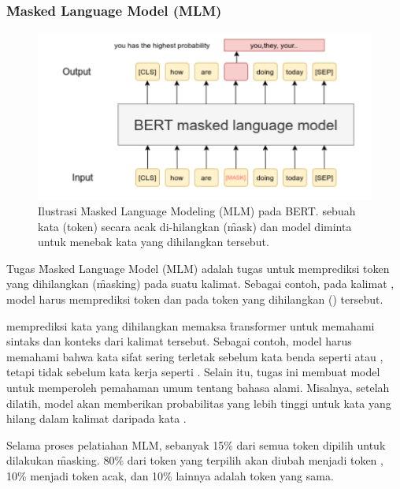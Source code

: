 	\subsubsection{\f{Masked Language Model} (MLM)}
	\label{sec:masked-language-model}

	\begin{figure}[!ht]
		\centering
		\includegraphics[width=1\textwidth]{assets/pics/MLM.png}
		\caption{Ilustrasi \f{Masked Language Modeling} (MLM) pada BERT. sebuah kata (token) secara acak di-hilangkan (\f{mask}) dan model diminta untuk menebak kata yang dihilangkan tersebut.}
		\label{fig:masked-language-model}
	\end{figure}

	Tugas \f{Masked Language Model} (MLM) adalah tugas untuk memprediksi token yang dihilangkan (\f{masking}) pada suatu kalimat. Sebagai contoh, pada kalimat , model harus memprediksi token  dan  pada token yang dihilangkan (\code{[MASK]}) tersebut.


	memprediksi kata yang dihilangkan memaksa \f{transformer} untuk memahami sintaks dan konteks dari kalimat tersebut. Sebagai contoh, model harus memahami bahwa kata sifat  sering terletak sebelum kata benda seperti  atau , tetapi tidak sebelum kata kerja seperti . Selain itu, tugas ini membuat model untuk memperoleh pemahaman umum tentang bahasa alami. Misalnya, setelah dilatih, model akan memberikan probabilitas yang lebih tinggi untuk kata  yang hilang dalam kalimat  daripada kata .

	Selama proses pelatiahan MLM, sebanyak 15\% dari semua token dipilih untuk dilakukan \f{masking}. 80\% dari token yang terpilih akan diubah menjadi token \code{[MASK]}, 10\% menjadi token acak, dan 10\% lainnya adalah token yang sama.

